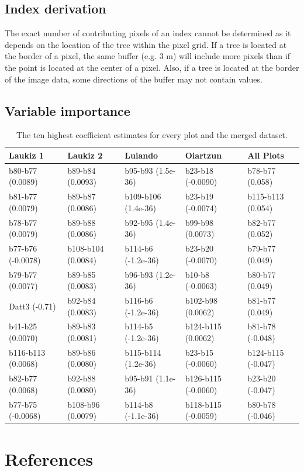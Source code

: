 \documentclass[review]{elsarticle}
\begin{document}
\subsection{Index derivation}

The exact number of contributing pixels of an index cannot be determined as it depends on the location of the tree within the pixel grid.
If a tree is located at the border of a pixel, the same buffer (e.g. 3 m) will include more pixels than if the point is located at the center of a pixel.
Also, if a tree is located at the border of the image data, some directions of the buffer may not contain values.

\subsection{Variable importance}

\begin{table}[b!]
\centering
\caption[t]{The ten highest coefficient estimates for every plot and the merged dataset.}
\begingroup\footnotesize
\begin{tabular}{lllll}
	\\
	Laukiz 1           & Laukiz 2           & Luiando             & Oiartzun            & All Plots          \\
	\hline
	b80-b77 (0.0089)   & b89-b84 (0.0093)   & b95-b93 (1.5e-36)   & b23-b18 (-0.0090)   & b78-b77 (0.058)    \\
	b81-b77 (0.0079)   & b89-b87 (0.0086)   & b109-b106 (1.4e-36) & b23-b19 (-0.0074)   & b115-b113 (0.054)  \\
	b78-b77 (0.0079)   & b89-b88 (0.0086)   & b92-b95 (1.4e-36)   & b99-b98 (0.0073)    & b82-b77 (0.052)    \\
	b77-b76 (-0.0078)  & b108-b104 (0.0084) & b114-b6 (-1.2e-36)  & b23-b20 (-0.0070)   & b79-b77 (0.049)    \\
	b79-b77 (0.0077)   & b89-b85 (0.0083)   & b96-b93 (1.2e-36)   & b10-b8 (-0.0063)    & b80-b77 (0.049)    \\
	Datt3 (-0.71)      & b92-b84 (0.0083)   & b116-b6 (-1.2e-36)  & b102-b98 (0.0062)   & b81-b77 (0.049)    \\
	b41-b25 (0.0070)   & b89-b83 (0.0081)   & b114-b5 (-1.2e-36)  & b124-b115 (0.0062)  & b81-b78 (-0.048)   \\
	b116-b113 (0.0068) & b89-b86 (0.0080)   & b115-b114 (1.2e-36) & b23-b15 (-0.0060)   & b124-b115 (-0.047) \\
	b82-b77 (0.0068)   & b92-b88 (0.0080)   & b95-b91 (1.1e-36)   & b126-b115 (-0.0060) & b23-b20 (-0.047)   \\
	b77-b75 (-0.0068)  & b108-b96 (0.0079)  & b114-b8 (-1.1e-36)  & b118-b115 (-0.0059) & b80-b78 (-0.046)   \\
	\bottomrule
\end{tabular}
\endgroup
\label{tab:variable-importance}
\end{table}

\section*{References}


\end{document}
